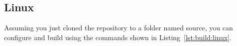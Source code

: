 

\subsection{Linux}
\label{section:build:linux}

Assuming you just cloned the repository to a folder named source, you can configure and build using the commands shown in Listing~\ref{lst:build:linux}.


